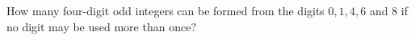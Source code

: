 How many four-digit odd integers can be formed from the digits $0,1,4,6$ and $8$ if no digit may be used more than once?
